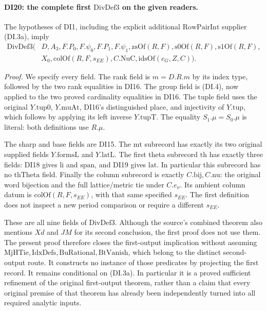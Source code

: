 \paragraph{DI20: the complete first \(\mathrm{DivDef3}\) on the given readers.}
\label{claim:DI20}
The hypotheses of DI1, including the explicit additional
\(\mathrm{RowPairInt}\) supplier (DI.3a), imply
\[
 \begin{split}
 \mathrm{DivDef3}\bigl(&D,A_3,F.P_0,F.\psi_0,F.P_1,F.\psi_1,
        \mathrm{zsOf}(R,F),\mathrm{s0Of}(R,F),\mathrm{s1Of}(R,F),\\
       &X_0,\mathrm{colOf}(R,F,s_{EE}),C.\mathrm{NuC},
                                         \mathrm{idsOf}(c_G,Z,C)\bigr).
 \end{split}
 \tag{DI.47}
\]

\emph{Proof.}
We specify every field. The rank field is \(m=D.R.m\) by its
index type, followed by the two rank equalities in DI16. The group
field is (DI.4), now applied to the two proved cardinality equalities
in DI16. The tuple field uses the original
\(Y.\mathrm{tup0}\), \(Y.\mathrm{muAt}\), DI16's distinguished
place, and injectivity of \(Y.\mathrm{tup}\), which follows by
applying its left inverse \(Y.\mathrm{tupT}\). The equality
\(S_1.\mu=S_0.\mu\) is literal: both definitions use \(R.\mu\).

The sharp and base fields are DI15. The \(\mathrm{mt}\) subrecord
has exactly its two original supplied fields
\(Y.\mathrm{formsL}\) and \(Y.\mathrm{latL}\). The first theta
subrecord \(\mathrm{th}\) has exactly three fields: DI18 gives
\(\mathrm{li}\) and \(\mathrm{span}\), and DI19 gives
\(\mathrm{lat}\). In particular this subrecord has no
\(\mathrm{thTheta}\) field. Finally the column subrecord is exactly
\(C.\mathrm{bij},C.\mathrm{nu}\): the original word bijection and
the full lattice/metric tie under \(C.e_\nu\). Its ambient column
datum is \(\mathrm{colOf}(R,F,s_{EE})\), with that same specified
\(s_{EE}\). The first definition does not inspect a new period
comparison or require a different \(s_{EE}\).

These are all nine fields of \(\mathrm{DivDef3}\). Although the
source's combined theorem also mentions \(Xd\) and \(JM\) for its
second conclusion, the first proof does not use them. The present
proof therefore closes the first-output implication without assuming
\(\mathrm{MjHTie,IdxDefs,BuRational,BtVanish}\), which belong to
the distinct second-output route. It constructs no instance of those
predicates by projecting the first record.
It remains conditional on (DI.3a). In particular it is a proved
sufficient refinement of the original first-output theorem, rather
than a claim that every original premise of that theorem has already
been independently turned into all required analytic inputs.

